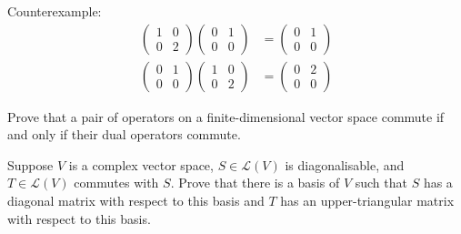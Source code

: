 \begin{solution}
Counterexample:
\begin{align*}
\begin{pmatrix}
1&0\\
0&2
\end{pmatrix}
\begin{pmatrix}
0&1\\
0&0
\end{pmatrix}&=
\begin{pmatrix}
0&1\\
0&0
\end{pmatrix}\\
\begin{pmatrix}
0&1\\
0&0
\end{pmatrix}
\begin{pmatrix}
1&0\\
0&2
\end{pmatrix}&=
\begin{pmatrix}
0&2\\
0&0
\end{pmatrix}
\end{align*}
\end{solution}

\begin{exercise}
Prove that a pair of operators on a finite-dimensional vector space commute if and only if their dual operators commute.
\end{exercise}

\begin{exercise}
Suppose $V$ is a complex vector space, $S\in\mathcal{L}(V)$ is diagonalisable, and $T\in\mathcal{L}(V)$ commutes with $S$. Prove that there is a basis of $V$ such that $S$ has a diagonal matrix with respect to this basis and $T$ has an upper-triangular matrix with respect to this basis.
\end{exercise}